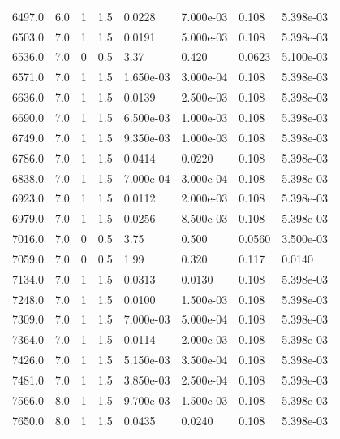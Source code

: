 \documentclass[preview]{standalone}
\begin{document}
{{{{\begin{tabular}{L{1.2cm}C{1.2cm} C{0.3cm}C{0.5cm} C{1.4cm}C{1.4cm} C{1.4cm}C{1.4cm}}
  6497.0  &   6.0  & 1     & 1.5 &  0.0228  & 7.000e-03  & 0.108 &  5.398e-03   \\ 
  6503.0  &   7.0  & 1     & 1.5 &  0.0191  & 5.000e-03  & 0.108 &  5.398e-03   \\ 
  6536.0  &   7.0  & 0     & 0.5 &  3.37  & 0.420  & 0.0623 &  5.100e-03   \\ 
  6571.0  &   7.0  & 1     & 1.5 &  1.650e-03  & 3.000e-04  & 0.108 &  5.398e-03   \\ 
  6636.0  &   7.0  & 1     & 1.5 &  0.0139  & 2.500e-03  & 0.108 &  5.398e-03   \\ 
  6690.0  &   7.0  & 1     & 1.5 &  6.500e-03  & 1.000e-03  & 0.108 &  5.398e-03   \\ 
  6749.0  &   7.0  & 1     & 1.5 &  9.350e-03  & 1.000e-03  & 0.108 &  5.398e-03   \\ 
  6786.0  &   7.0  & 1     & 1.5 &  0.0414  & 0.0220  & 0.108 &  5.398e-03   \\ 
  6838.0  &   7.0  & 1     & 1.5 &  7.000e-04  & 3.000e-04  & 0.108 &  5.398e-03   \\ 
  6923.0  &   7.0  & 1     & 1.5 &  0.0112  & 2.000e-03  & 0.108 &  5.398e-03   \\ 
  6979.0  &   7.0  & 1     & 1.5 &  0.0256  & 8.500e-03  & 0.108 &  5.398e-03   \\ 
  7016.0  &   7.0  & 0     & 0.5 &  3.75  & 0.500  & 0.0560 &  3.500e-03   \\ 
  7059.0  &   7.0  & 0     & 0.5 &  1.99  & 0.320  & 0.117 &  0.0140   \\ 
  7134.0  &   7.0  & 1     & 1.5 &  0.0313  & 0.0130  & 0.108 &  5.398e-03   \\ 
  7248.0  &   7.0  & 1     & 1.5 &  0.0100  & 1.500e-03  & 0.108 &  5.398e-03   \\ 
  7309.0  &   7.0  & 1     & 1.5 &  7.000e-03  & 5.000e-04  & 0.108 &  5.398e-03   \\ 
  7364.0  &   7.0  & 1     & 1.5 &  0.0114  & 2.000e-03  & 0.108 &  5.398e-03   \\ 
  7426.0  &   7.0  & 1     & 1.5 &  5.150e-03  & 3.500e-04  & 0.108 &  5.398e-03   \\ 
  7481.0  &   7.0  & 1     & 1.5 &  3.850e-03  & 2.500e-04  & 0.108 &  5.398e-03   \\ 
  7566.0  &   8.0  & 1     & 1.5 &  9.700e-03  & 1.500e-03  & 0.108 &  5.398e-03   \\ 
  7650.0  &   8.0  & 1     & 1.5 &  0.0435  & 0.0240  & 0.108 &  5.398e-03   \\ 

\end{tabular}}}}}
\end{document}
